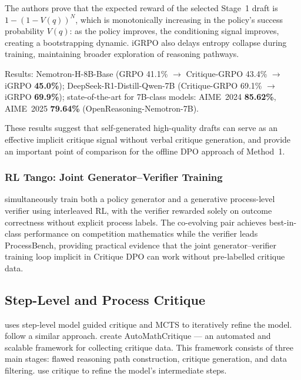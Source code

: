 The authors prove that the expected reward of the selected Stage~1 draft is $1 - (1-V(q))^N$, which is monotonically increasing in the policy's success probability $V(q)$: as the policy improves, the conditioning signal improves, creating a bootstrapping dynamic. iGRPO also delays entropy collapse during training, maintaining broader exploration of reasoning pathways.

Results: Nemotron-H-8B-Base (GRPO 41.1\% $\to$ Critique-GRPO 43.4\% $\to$ iGRPO \textbf{45.0\%}); DeepSeek-R1-Distill-Qwen-7B (Critique-GRPO 69.1\% $\to$ iGRPO \textbf{69.9\%}); state-of-the-art for 7B-class models: AIME~2024 \textbf{85.62\%}, AIME~2025 \textbf{79.64\%} (OpenReasoning-Nemotron-7B).

These results suggest that self-generated high-quality drafts can serve as an effective implicit critique signal without verbal critique generation, and provide an important point of comparison for the offline DPO approach of Method~1.

\subsubsection{RL Tango: Joint Generator--Verifier Training}

\autocite{zha2025rltangoreinforcinggenerator} simultaneously train both a policy generator and a generative process-level verifier using interleaved RL, with the verifier rewarded solely on outcome correctness without explicit process labels. The co-evolving pair achieves best-in-class performance on competition mathematics while the verifier leads ProcessBench, providing practical evidence that the joint generator--verifier training loop implicit in Critique DPO can work without pre-labelled critique data.

\subsection{Step-Level and Process Critique}

\autocite{yuan2025agentrtraininglanguagemodel} uses step-level model guided critique and MCTS to iteratively refine the model. \autocite{zhang2024llamaberrypairwiseoptimizationo1like} follow a similar approach. \autocite{xi2024enhancingllmreasoningcritique} create AutoMathCritique --- an automated and scalable framework for collecting critique data. This framework consists of three main stages: flawed reasoning path construction, critique generation, and data filtering. \autocite{paul2024refinerreasoningfeedbackintermediate} use critique to refine the model's intermediate steps.

%

%